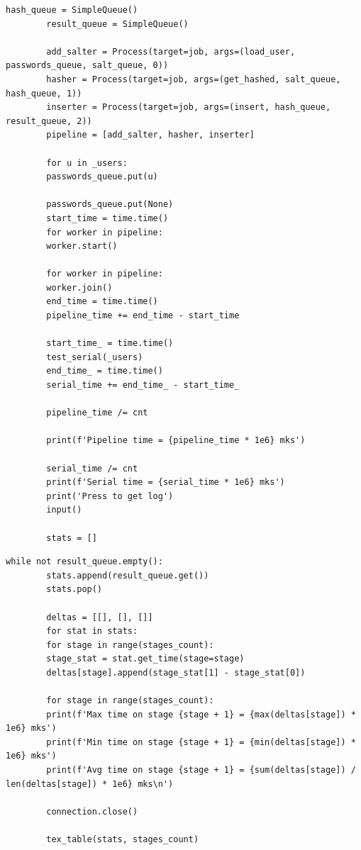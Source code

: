 \documentclass[12pt]{report}
\begin{document}
    \begin{lstlisting}[caption=Файл master.py (часть 4), label={lst:master4}]
    	hash_queue = SimpleQueue()
    	result_queue = SimpleQueue()
    	
    	add_salter = Process(target=job, args=(load_user, passwords_queue, salt_queue, 0))
    	hasher = Process(target=job, args=(get_hashed, salt_queue, hash_queue, 1))
    	inserter = Process(target=job, args=(insert, hash_queue, result_queue, 2))
    	pipeline = [add_salter, hasher, inserter]
    	
    	for u in _users:
    	passwords_queue.put(u)
    	
    	passwords_queue.put(None)
    	start_time = time.time()
    	for worker in pipeline:
    	worker.start()
    	
    	for worker in pipeline:
    	worker.join()
    	end_time = time.time()
    	pipeline_time += end_time - start_time
    	
    	start_time_ = time.time()
    	test_serial(_users)
    	end_time_ = time.time()
    	serial_time += end_time_ - start_time_
    	
    	pipeline_time /= cnt
    	
    	print(f'Pipeline time = {pipeline_time * 1e6} mks')
    	
    	serial_time /= cnt
    	print(f'Serial time = {serial_time * 1e6} mks')
    	print('Press to get log')
    	input()
    	
    	stats = []
    \end{lstlisting}
    \newpage
    \begin{lstlisting}[caption=Файл master.py (часть 5), label={lst:master5}]
    	while not result_queue.empty():
    	stats.append(result_queue.get())
    	stats.pop()
    	
    	deltas = [[], [], []]
    	for stat in stats:
    	for stage in range(stages_count):
    	stage_stat = stat.get_time(stage=stage)
    	deltas[stage].append(stage_stat[1] - stage_stat[0])
    	
    	for stage in range(stages_count):
    	print(f'Max time on stage {stage + 1} = {max(deltas[stage]) * 1e6} mks')
    	print(f'Min time on stage {stage + 1} = {min(deltas[stage]) * 1e6} mks')
    	print(f'Avg time on stage {stage + 1} = {sum(deltas[stage]) / len(deltas[stage]) * 1e6} mks\n')
    	
    	connection.close()
    	
    	tex_table(stats, stages_count)
    \end{lstlisting}
    
\end{document}

